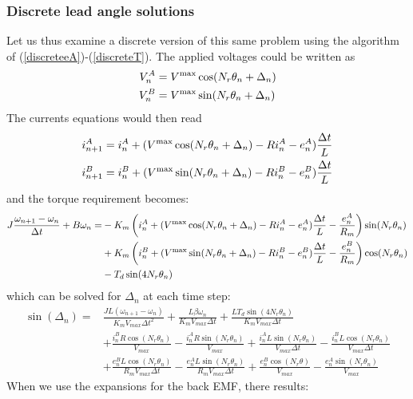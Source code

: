 \documentclass{article}
\begin{document}
\begin{appendix}
\subsubsection{Discrete lead angle solutions}
Let us thus examine a discrete version of this same problem using the algorithm of (\ref{discreteeA})-(\ref{discreteT}). The applied voltages could be written as
\begin{align}
V_{n}^A &= V^{\rm max} \cos(N_r \theta_{n}+\Delta_{n})\\
V_{n}^B &= V^{\rm max} \sin(N_r \theta_{n}+\Delta_{n})
\end{align}
The currents equations would then read
\begin{align}
i_{n+1}^A &=  i_n^A  + (V^{\rm max} \cos(N_r \theta_{n}+\Delta_{n})- R i_n^A - e^A_n) \frac{\Delta t}{L}\\
i_{n+1}^B  &= i_n^B  + (V^{\rm max} \sin(N_r \theta_{n}+\Delta_{n})- R i_n^B - e^B_n) \frac{\Delta t}{L}
\end{align}
and the torque requirement becomes:
\begin{equation}
\begin{split}
J \frac{\omega_{n+1}-\omega_n}{\Delta t} + B \omega_n =& -K_m \left(i_n^A  + (V^{\rm max} \cos(N_r \theta_{n}+\Delta_{n})- R i_n^A - e^A_n) \frac{\Delta t}{L} - \frac{e^A_n}{R_m}\right) \sin(N_r\theta_n) \\
&+ K_m \left(i_n^B  + (V^{\rm max} \sin(N_r \theta_{n}+\Delta_{n})- R i_n^B - e^B_n)  \frac{\Delta t}{L} - \frac{e^B_n}{R_m}\right)\cos(N_r\theta_n)\\
 &- T_d \sin(4N_r\theta_n)
\end{split}
\end{equation}
which can be solved for $\Delta_{n}$ at each time step:
\begin{align}
\sin(\Delta_n)=&\frac{J L (\omega_{n+1}-\omega_n)}{ K_m V_{max} \Delta t^2}
+\frac{L \beta  \omega_n}{K_m V_{max} \Delta t}
+\frac{L T_d \sin(4 N_r \theta_n)}{K_m  V_{max} \Delta t}\nonumber\\
&+\frac{i^B_n R \cos(N_r \theta_n)}{V_{max}}
-\frac{i^A_n R \sin(N_r \theta_n)}{V_{max}}
+\frac{i^A_n L \sin(N_r \theta_n)}{V_{max} \Delta t}
-\frac{i^B_n L \cos(N_r \theta_n)}{V_{max} \Delta t}\\ 
&+\frac{e^B_n L \cos(N_r \theta_n)}{R_m V_{max} \Delta t}
-\frac{e^A_n L \sin(N_r \theta_n)}{R_m V_{max} \Delta t}
+\frac{e^B_n \cos(N_r \theta )}{V_{max}}
-\frac{e^A_n \sin(N_r \theta_n )}{V_{max}}\nonumber
\end{align}
When we use the expansions for the back EMF, there results:

\end{appendix}
\end{document}
